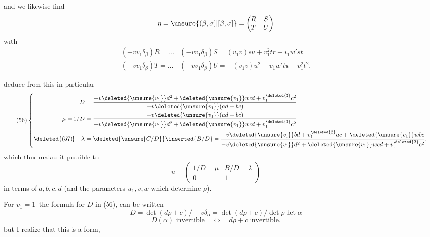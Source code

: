 
and we likewise find
\[
\eta=\unsure{(\beta,\sigma)|[\beta,\sigma]}=
\begin{pmatrix}R&S\\T&U\end{pmatrix}
\]
with
\[
\tag{55}
\begin{array}{ll}
(-vv_1\delta_\beta)R=\ldots
&(-vv_1\delta_\beta)S
 =(v_1v)su+v_1^{2}tr-v_1w'st\\
(-vv_1\delta_\beta)T=\ldots
&(-vv_1\delta_\beta)U
 =-(v_1v)u^2-v_1w'tu+v_1^{2}t^2.
\end{array}
\]

 deduce from this in particular
\[
\tag{56}
\left\{
\begin{aligned}
D&=\frac{-v\deleted{\unsure{v_1}}d^2+
\deleted{\unsure{v_1}}wcd+v_1^{\deleted{2}}c^2}
{-v\deleted{\unsure{v_1}}(ad-bc)}\\
\mu=1/D&=\frac{-v\deleted{\unsure{v_1}}(ad-bc)}
{-v\deleted{\unsure{v_1}}d^2+
\deleted{\unsure{v_1}}wcd+v_1^{\deleted{2}}c^2}\\
\deleted{(57)}\quad\lambda&=\deleted{\unsure{C/D}}\inserted{B/D}
=\frac{-v\deleted{\unsure{v_1}}bd+v_1^{\deleted{2}}ac+
\deleted{\unsure{v_1}}wbc}
{-v\deleted{\unsure{v_1}}d^2+
\deleted{\unsure{v_1}}wcd+v_1^{\deleted{2}}c^2}.
\end{aligned}
\right.
\]
which thus makes it possible to 
\[
\underline{u}=\begin{pmatrix}1/D=\mu&B/D=\lambda\\0&1\end{pmatrix}
\]
in terms of $a,b,c,d$ (and the parameters $u_1,v,w$
which determine $\rho$).

For \uline{$v_1=1$}, the formula for $D$ in (56), can be written
\[
\tag{57}
D=\det(d\rho+c)/-v\delta_\alpha
=\det(d\rho+c)/\det\rho\det\alpha
\]
\[
\tag{58}
D(\alpha)\text{ invertible}\quad\Longleftrightarrow\quad
d\rho+c\text{ invertible}.
\]
but I realize that this is a  form,